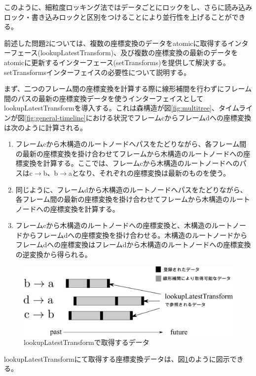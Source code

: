 \documentclass[a4paper]{jreport}	%
\begin{document}
このように、細粒度ロッキング法ではデータごとにロックをし、さらに読み込みロック・書き込みロックと区別をつけることにより並行性を上げることができる。


前述した問題2については、複数の座標変換のデータをatomicに取得するインターフェース(lookupLatestTransform)、及び複数の座標変換の最新のデータをatomicに更新するインターフェース(setTransforms)を提供して解決する。setTransformsインターフェイスの必要性について説明する。

まず、二つのフレーム間の座標変換を計算する際に線形補間を行わずにフレーム間のパスの最新の座標変換データを使うインターフェイスとしてlookupLatestTransformを導入する。これは森構造が図\ref{fig:multitree}、タイムラインが図\ref{fig:general-timeline}における状況でフレームcからフレームdへの座標変換は次のように計算される。

\begin{enumerate}
	\item フレームcから木構造のルートノードへパスをたどりながら、各フレーム間の最新の座標変換を掛け合わせてフレームから木構造のルートノードへの座標変換を計算する。ここでは、フレームcから木構造のルートノードへのパスはc$\rightarrow$b、b$\rightarrow$aとなり、それぞれの座標変換は最新のものを使う。
	\item 同じように、フレームdから木構造のルートノードへパスをたどりながら、各フレーム間の最新の座標変換を掛け合わせてフレームから木構造のルートノードへの座標変換を計算する。
	\item フレームcから木構造のルートノードへの座標変換と、木構造のルートノードからフレームdへの座標変換を掛け合わせる。木構造のルートノードからフレームdへの座標変換はフレームdから木構造のルートノードへの座標変換の逆変換から得られる。
\end{enumerate}

\begin{figure}[h] 
\centering
\includegraphics[width=12cm]{lookupLatestTransform}
\caption{lookupLatestTransformで取得するデータ}
\label{fig:lookupLatestTransform}
\end{figure}

lookupLatestTransformにて取得する座標変換データは、図\ref{fig:lookupLatestTransform}のように図示できる。
\end{document}
